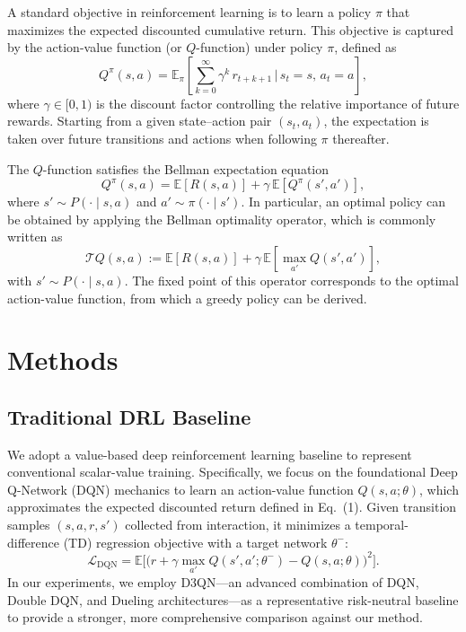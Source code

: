 \documentclass[runningheads]{llncs}
\begin{document}
A standard objective in reinforcement learning is to learn a policy $\pi$ that maximizes the expected discounted cumulative return. This objective is captured by the action-value function (or $Q$-function) under policy $\pi$, defined as
\begin{equation}
Q^{\pi}(s,a) = \mathbb{E}_{\pi}\!\left[\sum_{k=0}^{\infty}\gamma^{k}\, r_{t+k+1}\,\Big|\, s_t=s,\, a_t=a \right],
\label{eq:q_def}
\end{equation}
where $\gamma \in [0,1)$ is the discount factor controlling the relative importance of future rewards. Starting from a given state--action pair $(s_t,a_t)$, the expectation is taken over future transitions and actions when following $\pi$ thereafter.

The $Q$-function satisfies the Bellman expectation equation
\begin{equation}
Q^{\pi}(s,a) = \mathbb{E}\!\left[ R(s,a) \right] + \gamma\, \mathbb{E}\!\left[ Q^{\pi}(s',a') \right],
\label{eq:bellman_exp}
\end{equation}
where $s' \sim P(\cdot \mid s,a)$ and $a' \sim \pi(\cdot \mid s')$. In particular, an optimal policy can be obtained by applying the Bellman optimality operator, which is commonly written as
\begin{equation}
\mathcal{T}Q(s,a) := \mathbb{E}\!\left[ R(s,a) \right] + \gamma\, \mathbb{E}\!\left[\max_{a'} Q(s',a') \right],
\label{eq:bellman_opt}
\end{equation}
with $s' \sim P(\cdot \mid s,a)$. The fixed point of this operator corresponds to the optimal action-value function, from which a greedy policy can be derived.


\section{Methods}

\label{sec:method}

\subsection{Traditional DRL Baseline}
\label{sec:method_dqn}
We adopt a value-based deep reinforcement learning baseline to represent conventional scalar-value training. Specifically, we focus on the foundational Deep Q-Network (DQN) mechanics to learn an action-value function $Q(s,a;\theta)$, which approximates the expected discounted return defined in Eq.~(1). Given transition samples $(s,a,r,s')$ collected from interaction, it minimizes a temporal-difference (TD) regression objective with a target network $\theta^-$:
\begin{equation}
\mathcal{L}_{\mathrm{DQN}}
=
\mathbb{E}\Big[
\big(
r + \gamma \max_{a'} Q(s',a';\theta^-)
- Q(s,a;\theta)
\big)^2
\Big].
\label{eq:dqn_loss}
\end{equation}
In our experiments, we employ D3QN---an advanced combination of DQN, Double DQN, and Dueling architectures---as a representative risk-neutral baseline to provide a stronger, more comprehensive comparison against our method.
\end{document}
